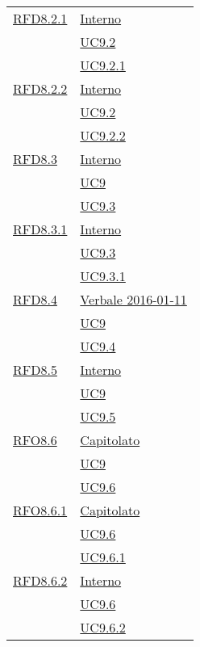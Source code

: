 \begin{longtable}{|>{\centering}m{5cm}|m{5cm}<{\centering}|}
\hyperlink{RFD8.2.1}{RFD8.2.1} & \hyperlink{Interno}{Interno}\\
& \hyperref[UC9.2]{UC9.2}\\
& \hyperref[UC9.2.1]{UC9.2.1}\\ \hline

\hyperlink{RFD8.2.2}{RFD8.2.2} & \hyperlink{Interno}{Interno}\\
& \hyperref[UC9.2]{UC9.2}\\
& \hyperref[UC9.2.2]{UC9.2.2}\\ \hline

\hyperlink{RFD8.3}{RFD8.3} & \hyperlink{Interno}{Interno}\\
& \hyperref[UC9]{UC9}\\
& \hyperref[UC9.3]{UC9.3}\\ \hline

\hyperlink{RFD8.3.1}{RFD8.3.1} & \hyperlink{Interno}{Interno}\\
& \hyperref[UC9.3]{UC9.3}\\
& \hyperref[UC9.3.1]{UC9.3.1}\\ \hline

\hyperlink{RFD8.4}{RFD8.4} & \hyperlink{Verbale 2016-01-11}{Verbale 2016-01-11}\\
& \hyperref[UC9]{UC9}\\
& \hyperref[UC9.4]{UC9.4}\\ \hline

\hyperlink{RFD8.5}{RFD8.5} & \hyperlink{Interno}{Interno}\\
& \hyperref[UC9]{UC9}\\
& \hyperref[UC9.5]{UC9.5}\\ \hline

\hyperlink{RFO8.6}{RFO8.6} & \hyperlink{Capitolato}{Capitolato}\\
& \hyperref[UC9]{UC9}\\
& \hyperref[UC9.6]{UC9.6}\\ \hline

\hyperlink{RFO8.6.1}{RFO8.6.1} & \hyperlink{Capitolato}{Capitolato}\\
& \hyperref[UC9.6]{UC9.6}\\
& \hyperref[UC9.6.1]{UC9.6.1}\\ \hline

\hyperlink{RFD8.6.2}{RFD8.6.2} & \hyperlink{Interno}{Interno}\\
& \hyperref[UC9.6]{UC9.6}\\
& \hyperref[UC9.6.2]{UC9.6.2}\\ \hline


\end{longtable}
